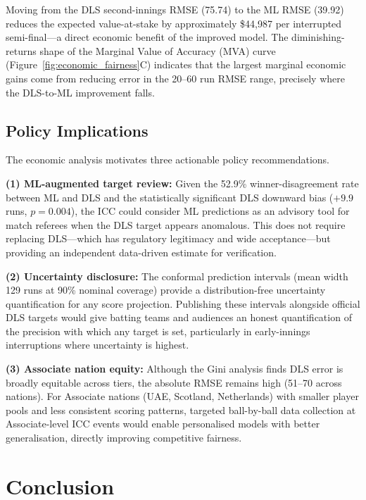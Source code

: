 \documentclass[10pt,a4paper,twocolumn]{article}
\begin{document}
Moving from the DLS second-innings RMSE (75.74) to the ML RMSE (39.92) reduces the expected value-at-stake by approximately \$44,987 per interrupted semi-final---a direct economic benefit of the improved model. The diminishing-returns shape of the Marginal Value of Accuracy (MVA) curve (Figure~\ref{fig:economic_fairness}C) indicates that the largest marginal economic gains come from reducing error in the 20--60 run RMSE range, precisely where the DLS-to-ML improvement falls.

\subsection{Policy Implications}

The economic analysis motivates three actionable policy recommendations.

\textbf{(1) ML-augmented target review:} Given the 52.9\% winner-disagreement rate between ML and DLS and the statistically significant DLS downward bias ($+9.9$ runs, $p=0.004$), the ICC could consider ML predictions as an advisory tool for match referees when the DLS target appears anomalous. This does not require replacing DLS---which has regulatory legitimacy and wide acceptance---but providing an independent data-driven estimate for verification.

\textbf{(2) Uncertainty disclosure:} The conformal prediction intervals (mean width 129 runs at 90\% nominal coverage) provide a distribution-free uncertainty quantification for any score projection. Publishing these intervals alongside official DLS targets would give batting teams and audiences an honest quantification of the precision with which any target is set, particularly in early-innings interruptions where uncertainty is highest.

\textbf{(3) Associate nation equity:} Although the Gini analysis finds DLS error is broadly equitable across tiers, the absolute RMSE remains high (51--70 across nations). For Associate nations (UAE, Scotland, Netherlands) with smaller player pools and less consistent scoring patterns, targeted ball-by-ball data collection at Associate-level ICC events would enable personalised models with better generalisation, directly improving competitive fairness.

\section{Conclusion}
\label{sec:conclusion}
\end{document}
